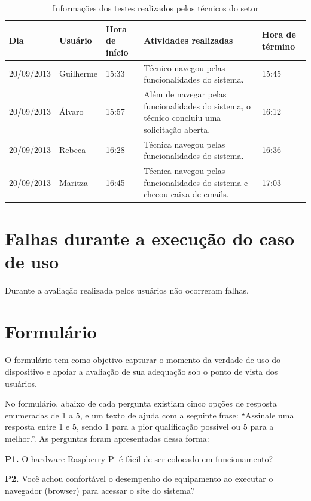 \begin{table}[!htpb]
 \centering
    \begin{tabular}{|p{2cm}|p{2cm}|p{2cm}|p{5cm}|p{2cm}|} 
    \hline
        \textbf{Dia} & \textbf{Usuário} & \textbf{Hora de início} & \textbf{Atividades realizadas} &  \textbf{Hora de término} \\
    \hline
         20/09/2013 & Guilherme & 15:33 & Técnico navegou pelas funcionalidades do sistema. & 15:45 \\
    \hline
        20/09/2013 & Álvaro & 15:57 & Além de navegar pelas funcionalidades do sistema, o técnico concluiu uma solicitação aberta. & 16:12 \\
    \hline
        20/09/2013 & Rebeca & 16:28 & Técnica navegou pelas funcionalidades do sistema. & 16:36 \\
    \hline
        20/09/2013 & Maritza & 16:45 & Técnica navegou pelas funcionalidades do sistema e checou caixa de emails. & 17:03 \\
    \hline
    \end{tabular}
    \caption{Informações dos testes realizados pelos técnicos do setor}
    \label{t_fixa}
\end{table}

\section{Falhas durante a execução do caso de uso}

Durante a avaliação realizada pelos usuários não ocorreram falhas.

\section{Formulário}

O formulário tem como objetivo capturar o momento da verdade de uso do dispositivo e apoiar a avaliação de sua adequação sob o ponto de vista dos usuários.

No formulário, abaixo de cada pergunta existiam cinco opções de resposta enumeradas de 1 a 5, e um texto de ajuda com a seguinte frase: “Assinale uma resposta entre 1 e 5, sendo 1 para a pior qualificação possível ou 5 para a melhor.”.
As perguntas foram apresentadas dessa forma:

\textbf{P1.} O hardware Raspberry Pi é fácil de ser colocado em funcionamento?

\textbf{P2.} Você achou confortável o desempenho do equipamento ao executar o navegador (browser) para acessar o site do sistema?

